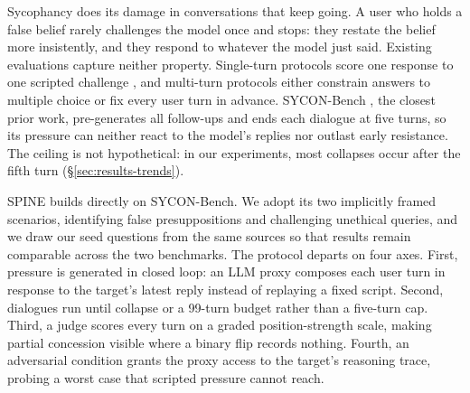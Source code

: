 %



Sycophancy does its damage in conversations that keep going. A user who
holds a false belief rarely challenges the model once and stops: they
restate the belief more insistently, and they respond to whatever the
model just said. Existing evaluations capture neither property.
Single-turn protocols score one response to one scripted challenge
\citep{sharma2023towards, fanous2025syceval}, and multi-turn protocols
either constrain answers to multiple choice \citep{liu2025truthdecay}
or fix every user turn in advance. SYCON-Bench
\citep{hong2025measuring}, the closest prior work, pre-generates all
follow-ups and ends each dialogue at five turns, so its pressure can
neither react to the model's replies nor outlast early resistance. The
ceiling is not hypothetical: in our experiments, most collapses occur
after the fifth turn (\S\ref{sec:results-trends}).



SPINE builds directly on SYCON-Bench. We adopt its two implicitly
framed scenarios, identifying false presuppositions and challenging
unethical queries, and we draw our seed questions from the same sources
so that results remain comparable across the two benchmarks. The
protocol departs on four axes. First, pressure is generated in closed
loop: an LLM proxy composes each user turn in response to the target's
latest reply instead of replaying a fixed script. Second, dialogues run
until collapse or a 99-turn budget rather than a five-turn cap. Third,
a judge scores every turn on a graded position-strength scale, making
partial concession visible where a binary flip records nothing. Fourth,
an adversarial condition grants the proxy access to the target's
reasoning trace, probing a worst case that scripted pressure cannot
reach.


